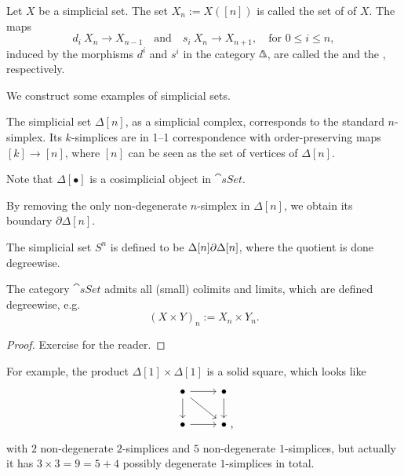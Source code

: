 Let $X$ be a simplicial set.
The set $X_n:=X([n])$ is called the set of  of $X$.
The maps 
\[ d_i\:X_n\to X_{n-1}\quad\text{and}\quad s_i\:X_n\to X_{n+1},\quad\text{for }0\leq i\leq n, \]
induced by the morphisms $d^i$ and $s^i$ in the category $\bfDelta$,
are called the  and the , respectively.

\begin{example}
    We construct some examples of simplicial sets.
    \begin{itms}
        \item The simplicial set $\Delta[n]$,
        as a simplicial complex, corresponds to the standard $n$-simplex.
        Its $k$-simplices are in 1--1 correspondence with 
        order-preserving maps $[k]\to[n]$,
        where $[n]$ can be seen as the set of vertices of $\Delta[n]$.
        \item Note that $\Delta[\bullet]$ is a cosimplicial object in $\cat{sSet}$.
        \item By removing the only non-degenerate $n$-simplex in $\Delta[n]$,
        we obtain its boundary $\partial\Delta[n]$.
        \item The simplicial set $S^n$ is defined to be $\Delta[n]\/\partial\Delta[n]$,
        where the quotient is done degreewise. \varqed
    \end{itms}
\end{example}

\begin{proposition}
    The category $\cat{sSet}$ admits all (small) colimits and limits, 
    which are defined degreewise, e.g.
    \[ (X\times Y)_n:=X_n\times Y_n. \]
\end{proposition}

\begin{proof}
    Exercise for the reader.
\end{proof}

For example, the product $\Delta[1]\times\Delta[1]$ is a solid square, which looks like
\[\begin{tikzcd}
    \bullet\ar[d]\ar[r]\ar[dr] & \bullet\ar[d] \\
    \bullet\ar[r] & \bullet\rlap{\ ,}
\end{tikzcd}\]
with $2$ non-degenerate $2$-simplices and $5$ non-degenerate $1$-simplices,
but actually it has $3\times3=9=5+4$ possibly degenerate $1$-simplices in total.

